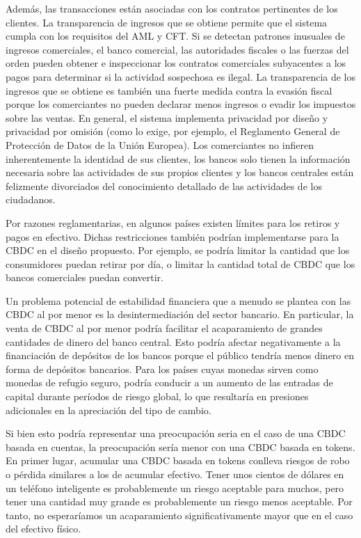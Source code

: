 \documentclass[a4paper,10pt]{article} %
\begin{document}
Además, las transacciones están asociadas con los contratos pertinentes
de los clientes. La transparencia de ingresos que se obtiene permite que
el sistema cumpla con los requisitos del AML y CFT. Si se detectan
patrones inusuales de ingresos comerciales, el banco comercial, las
autoridades fiscales o las fuerzas del orden pueden obtener e
inspeccionar los contratos comerciales subyacentes a los pagos para
determinar si la actividad sospechosa es ilegal. La transparencia de los
ingresos que se obtiene es también una fuerte medida contra la evasión
fiscal porque los comerciantes no pueden declarar menos ingresos o
evadir los impuestos sobre las ventas. En general, el sistema implementa
privacidad por diseño y privacidad por omisión (como lo exige, por
ejemplo, el Reglamento General de Protección de Datos de la Unión
Europea). Los comerciantes no infieren inherentemente la identidad de
sus clientes, los bancos solo tienen la información necesaria sobre las
actividades de sus propios clientes y los bancos centrales están
felizmente divorciados del conocimiento detallado de las actividades de
los ciudadanos.

Por razones reglamentarias, en algunos países existen límites para los
retiros y pagos en efectivo. Dichas restricciones también podrían
implementarse para la CBDC en el diseño propuesto. Por ejemplo, se
podría limitar la cantidad que los consumidores puedan retirar por día,
o limitar la cantidad total de CBDC que los bancos comerciales puedan
convertir.

Un problema potencial de estabilidad financiera que a menudo se plantea
con las CBDC al por menor es la desintermediación del sector bancario.
En particular, la venta de CBDC al por menor podría facilitar el
acaparamiento de grandes cantidades de dinero del banco central. Esto
podría afectar negativamente a la financiación de depósitos de los
bancos porque el público tendría menos dinero en forma de depósitos
bancarios. Para los países cuyas monedas sirven como monedas de refugio
seguro, podría conducir a un aumento de las entradas de capital durante
períodos de riesgo global, lo que resultaría en presiones adicionales en
la apreciación del tipo de cambio.

Si bien esto podría representar una preocupación seria en el caso de una
CBDC basada en cuentas, la preocupación sería menor con una CBDC basada
en tokens. En primer lugar, acumular una CBDC basada en tokens conlleva
riesgos de robo o pérdida similares a los de acumular efectivo. Tener
unos cientos de dólares en un teléfono inteligente es probablemente un
riesgo aceptable para muchos, pero tener una cantidad muy grande es
probablemente un riesgo menos aceptable. Por tanto, no esperaríamos un
acaparamiento significativamente mayor que en el caso del efectivo
físico.
\end{document}
